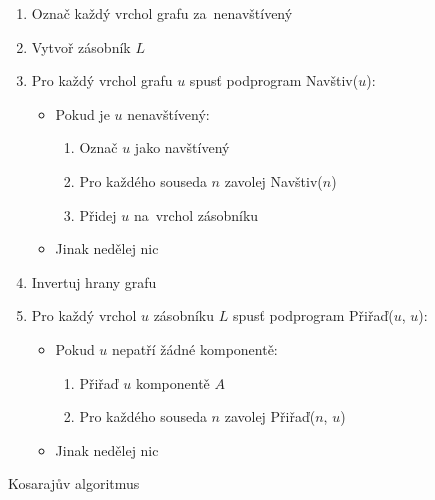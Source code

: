 \begin{figure}[htbp]
    \begin{minipage}{0.45\textwidth}
        \small
        \onehalfspacing
        \begin{enumerate}
            \item Označ každý vrchol grafu za~nenavštívený
            \item Vytvoř zásobník $L$
            \item Pro každý vrchol grafu $u$ spusť podprogram Navštiv($u$):
                  \begin{itemize}
                      \item Pokud je $u$ nenavštívený:
                            \begin{enumerate}
                                \item Označ $u$ jako navštívený
                                \item Pro každého souseda $n$ zavolej Navštiv($n$)
                                \item Přidej $u$ na~vrchol zásobníku
                            \end{enumerate}
                      \item Jinak nedělej nic
                  \end{itemize}
            \item Invertuj hrany grafu
            \item Pro každý vrchol $u$ zásobníku $L$ spusť podprogram Přiřaď($u$, $u$):
                  \begin{itemize}
                      \item Pokud $u$ nepatří žádné komponentě:
                            \begin{enumerate}
                                \item Přiřaď $u$ komponentě $A$
                                \item Pro každého souseda $n$ zavolej Přiřaď($n$, $u$)
                            \end{enumerate}
                      \item Jinak nedělej nic
                  \end{itemize}
        \end{enumerate}
        \caption{Kosarajův algoritmus}
        \label{fig:kosaraj}
    \end{minipage}
    \hfill
    \begin{minipage}{0.45\textwidth}
        \small

\end{minipage}
\end{figure}
